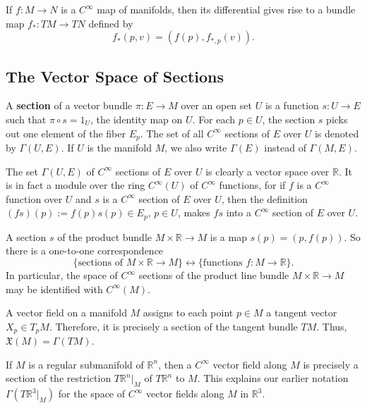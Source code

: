 \begin{example}
\begin{example}
If $f : M \to N$ is a $C^{\infty}$ map of manifolds, then its differential gives rise to a bundle map $f_* : TM \to TN$ defined by
\[
f_*(p,v) = (f(p), f_{*,p}(v)).
\]
\end{example}

\subsection{The Vector Space of Sections}

A \textbf{section} of a vector bundle $\pi : E \to M$ over an open set $U$ is a function $s : U \to E$ such that $\pi \circ s = 1_U$, the identity map on $U$. For each $p \in U$, the section $s$ picks out one element of the fiber $E_p$. The set of all $C^{\infty}$ sections of $E$ over $U$ is denoted by $\Gamma(U,E)$. If $U$ is the manifold $M$, we also write $\Gamma(E)$ instead of $\Gamma(M,E)$.

The set $\Gamma(U,E)$ of $C^{\infty}$ sections of $E$ over $U$ is clearly a vector space over $\mathbb{R}$. It is in fact a module over the ring $C^{\infty}(U)$ of $C^{\infty}$ functions, for if $f$ is a $C^{\infty}$ function over $U$ and $s$ is a $C^{\infty}$ section of $E$ over $U$, then the definition $(fs)(p) := f(p)s(p) \in E_p$, $p \in U$, makes $fs$ into a $C^{\infty}$ section of $E$ over $U$.

\begin{example}
A section $s$ of the product bundle $M \times \mathbb{R} \to M$ is a map $s(p) = (p, f(p))$. So there is a one-to-one correspondence
\[
\{\text{sections of } M \times \mathbb{R} \to M\} \longleftrightarrow \{\text{functions } f : M \to \mathbb{R}\}.
\]
In particular, the space of $C^{\infty}$ sections of the product line bundle $M \times \mathbb{R} \to M$ may be identified with $C^{\infty}(M)$.
\end{example}

\begin{example}
A vector field on a manifold $M$ assigns to each point $p \in M$ a tangent vector $X_p \in T_p M$. Therefore, it is precisely a section of the tangent bundle $TM$. Thus, $\mathfrak{X}(M) = \Gamma(TM)$.
\end{example}

\begin{example}
If $M$ is a regular submanifold of $\mathbb{R}^n$, then a $C^{\infty}$ vector field along $M$ is precisely a section of the restriction $T\mathbb{R}^n|_M$ of $T\mathbb{R}^n$ to $M$. This explains our earlier notation $\Gamma(T\mathbb{R}^3|_M)$ for the space of $C^{\infty}$ vector fields along $M$ in $\mathbb{R}^3$.
\end{example}


\end{example}
